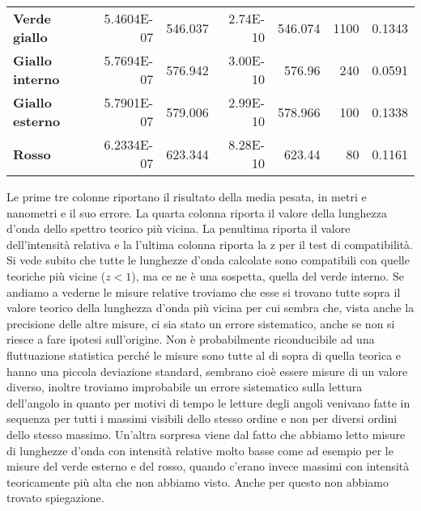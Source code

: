 \documentclass[a4paper,10pt]{article}
\begin{document}
\begin{table}[htbp]
\begin{tabular}{lrrrrrr}
    \rowcolor[rgb]{ .267,  .447,  .769} \textcolor[rgb]{ 1,  1,  1}{\textbf{Verde giallo}} & \cellcolor[rgb]{ 1,  1,  1} 5.4604E-07 & \cellcolor[rgb]{ 1,  1,  1} 546.037 & \cellcolor[rgb]{ 1,  1,  1} 2.74E-10 & \cellcolor[rgb]{ 1,  1,  1} 546.074 & \cellcolor[rgb]{ 1,  1,  1} 1100 & \cellcolor[rgb]{ 1,  1,  1} 0.1343 \\
    \rowcolor[rgb]{ .267,  .447,  .769} \textcolor[rgb]{ 1,  1,  1}{\textbf{Giallo interno}} & \cellcolor[rgb]{ .851,  .851,  .851} 5.7694E-07 & \cellcolor[rgb]{ .851,  .851,  .851} 576.942 & \cellcolor[rgb]{ .851,  .851,  .851} 3.00E-10 & \cellcolor[rgb]{ .851,  .851,  .851} 576.96 & \cellcolor[rgb]{ .851,  .851,  .851} 240 & \cellcolor[rgb]{ .851,  .851,  .851} 0.0591 \\
    \rowcolor[rgb]{ .267,  .447,  .769} \textcolor[rgb]{ 1,  1,  1}{\textbf{Giallo esterno}} & \cellcolor[rgb]{ 1,  1,  1} 5.7901E-07 & \cellcolor[rgb]{ 1,  1,  1} 579.006 & \cellcolor[rgb]{ 1,  1,  1} 2.99E-10 & \cellcolor[rgb]{ 1,  1,  1} 578.966 & \cellcolor[rgb]{ 1,  1,  1} 100 & \cellcolor[rgb]{ 1,  1,  1} 0.1338 \\
    \rowcolor[rgb]{ .267,  .447,  .769} \textcolor[rgb]{ 1,  1,  1}{\textbf{Rosso}} & \cellcolor[rgb]{ .851,  .851,  .851} 6.2334E-07 & \cellcolor[rgb]{ .851,  .851,  .851} 623.344 & \cellcolor[rgb]{ .851,  .851,  .851} 8.28E-10 & \cellcolor[rgb]{ .851,  .851,  .851} 623.44 & \cellcolor[rgb]{ .851,  .851,  .851} 80 & \cellcolor[rgb]{ .851,  .851,  .851} 0.1161 \\
     \toprule
    \end{tabular}%
  \label{tab6}%
\end{table}%

	Le prime tre colonne riportano il risultato della media pesata, in metri e nanometri e il suo errore. La quarta colonna riporta il valore della lunghezza d'onda dello spettro teorico più vicina. La penultima riporta il valore dell'intensità relativa e la l'ultima colonna riporta la z per il test di compatibilità.
	Si vede subito che tutte le lunghezze d'onda calcolate sono compatibili con quelle teoriche più vicine ($z < 1$), ma ce ne è una sospetta, quella del verde interno. Se andiamo a vederne le misure relative troviamo che esse si trovano tutte sopra il valore teorico della lunghezza d'onda più vicina per cui sembra che, vista anche la precisione delle altre misure, ci sia stato un errore sistematico, anche se non si riesce a fare ipotesi sull'origine. Non è probabilmente riconducibile ad una fluttuazione statistica perché le misure sono tutte al di sopra di quella teorica e hanno una piccola deviazione standard, sembrano cioè essere misure di un valore diverso, inoltre troviamo improbabile un errore sistematico sulla lettura dell'angolo in quanto per motivi di tempo le letture degli angoli venivano fatte in sequenza per tutti i massimi visibili dello stesso ordine e non per diversi ordini dello stesso massimo.
	Un'altra sorpresa viene dal fatto che abbiamo letto misure di lunghezze d'onda con intensità relative molto basse come ad esempio per le misure del verde esterno e del rosso, quando c'erano invece massimi con intensità teoricamente più alta che non abbiamo visto. Anche per questo non abbiamo trovato spiegazione.
	
\end{document}
